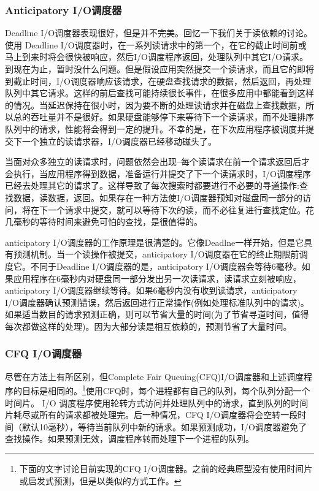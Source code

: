 \subsubsection{Anticipatory I/O调度器}

Deadline I/O调度器表现很好，但是并不完美。回忆一下我们关于读依赖的讨论。使用 Deadline I/O调度器时，在一系列读请求中的第一个，在它的截止时间前或马上到来时将会很快被响应，然后I/O调度程序返回，处理队列中其它I/O请求。到现在为止，暂时没什么问题。但是假设应用突然提交一个读请求，而且它的即将到截止时间，I/O调度器响应该请求，在硬盘查找请求的数据，然后返回，再处理队列中其它请求。这样的前后查找可能持续很长事件，在很多应用中都能看到这样的情况。当延迟保持在很小时，因为要不断的处理读请求并在磁盘上查找数据，所以总的吞吐量并不是很好。如果硬盘能够停下来等待下一个读请求，而不处理排序队列中的请求，性能将会得到一定的提升。不幸的是，在下次应用程序被调度并提交下一个独立的读请求器，I/O调度器已经移动磁头了。
     
当面对众多独立的读请求时，问题依然会出现--每个读请求在前一个请求返回后才会执行，当应用程序得到数据，准备运行并提交了下一个读请求时，I/O调度程序已经去处理其它的请求了。这样导致了每次搜索时都要进行不必要的寻道操作:查找数据，读数据，返回。如果存在一种方法使I/O调度器预知对磁盘同一部分的访问，将在下一个请求中提交，就可以等待下次的读，而不必往复进行查找定位。花几毫秒的等待时间来避免可怕的查找，是很值得的。
     
anticipatory I/O调度器的工作原理是很清楚的。它像Deadlne一样开始，但是它具有预测机制。当一个读操作被提交，anticipatory I/O调度器在它的终止期限前调度它。不同于Deadline I/O调度器的是，anticipatory I/O调度器会等待6毫秒。如果应用程序在6毫秒内对硬盘同一部分发出另一次读请求，读请求立刻被响应，anticipatory I/O调度器继续等待。如果6毫秒内没有收到读请求，anticipatory I/O调度器确认预测错误，然后返回进行正常操作(例如处理标准队列中的请求)。如果适当数目的请求预测正确，则可以节省大量的时间(为了节省寻道时间，值得每次都做这样的处理)。因为大部分读是相互依赖的，预测节省了大量时间。

\subsubsection{CFQ I/O调度器}

尽管在方法上有所区别，但Complete Fair Queuing(CFQ)I/O调度器和上述调度程序的目标是相同的。\footnote[1]{下面的文字讨论目前实现的CFQ I/O调度器。之前的经典原型没有使用时间片或启发式预测，但是以类似的方式工作。}使用CFQ时，每个进程都有自己的队列，每个队列分配一个时间片。 I/O 调度程序使用轮转方式访问并处理队列中的请求，直到队列的时间片耗尽或所有的请求都被处理完。后一种情况，CFQ I/O调度器将会空转一段时间（默认10毫秒），等待当前队列中新的请求。如果预测成功，I/O调度器避免了查找操作。如果预测无效，调度程序转而处理下一个进程的队列。

